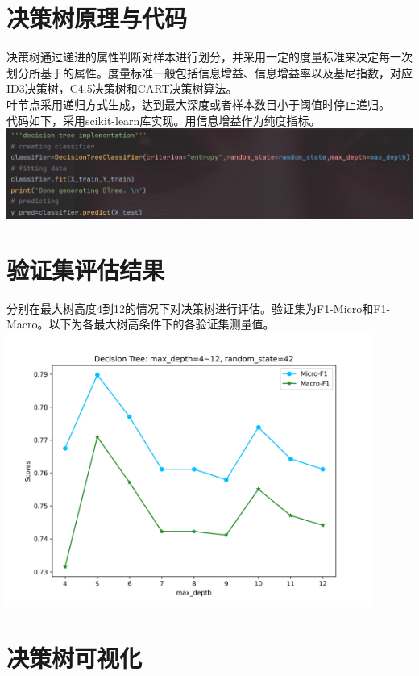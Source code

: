 \documentclass{article}
\begin{document}
\section{决策树原理与代码}
决策树通过递进的属性判断对样本进行划分，并采用一定的度量标准来决定每一次划分所基于的属性。度量标准一般包括信息增益、信息增益率以及基尼指数，对应ID3决策树，C4.5决策树和CART决策树算法。\\
叶节点采用递归方式生成，达到最大深度或者样本数目小于阈值时停止递归。\\
代码如下，采用scikit-learn库实现。用信息增益作为纯度指标。\\
\includegraphics[width=1.0\textwidth]{code_screenshot/DTreeMain.png}\\
\section{验证集评估结果}
分别在最大树高度4到12的情况下对决策树进行评估。验证集为F1-Micro和F1-Macro。以下为各最大树高条件下的各验证集测量值。\\
\includegraphics[width=0.9\textwidth]{../python/result/compare_4_to_12.png}\\
\section{决策树可视化}
\end{document}
